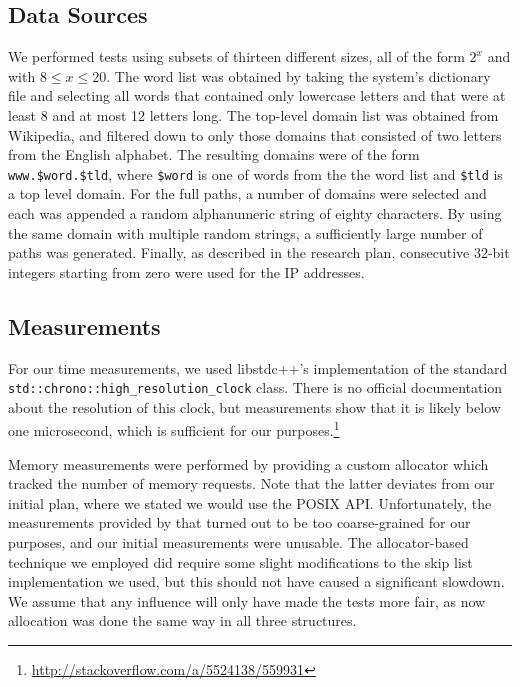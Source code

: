 \documentclass[12pt,a4paper]{article}
\begin{document}
    \subsection{Data Sources}

    We performed tests using subsets of thirteen different sizes, all of the form $2^x$ and with $8
    \le x \le 20$.  The word list was obtained by taking the system's dictionary file and selecting
    all words that contained only lowercase letters and that were at least 8 and at most 12 letters
    long.  The top-level domain list was obtained from Wikipedia, and filtered down to only those
    domains that consisted of two letters from the English alphabet.  The resulting domains were of
    the form \texttt{www.\$word.\$tld}, where \texttt{\$word} is one of words from the the word list
    and \texttt{\$tld} is a top level domain.  For the full paths, a number of domains were selected
    and each was appended a random alphanumeric string of eighty characters.  By using the same
    domain with multiple random strings, a sufficiently large number of paths was generated.
    Finally, as described in the research plan, consecutive 32-bit integers starting from zero were
    used for the IP addresses.

    \subsection{Measurements}
    \label{subsec:measurements}

    For our time measurements, we used libstdc++'s implementation of the standard
    \texttt{std::chrono::high\_resolution\_clock} class.  There is no official documentation about
    the resolution of this clock, but measurements show that it is likely below one microsecond,
    which is sufficient for our purposes.\footnote{\url{http://stackoverflow.com/a/5524138/559931}}

    Memory measurements were performed by providing a custom allocator which tracked the number of
    memory requests.  Note that the latter deviates from our initial plan, where we stated we would
    use the POSIX API.  Unfortunately, the measurements provided by that turned out to be too
    coarse-grained for our purposes, and our initial measurements were unusable.  The
    allocator-based technique we employed did require some slight modifications to the skip list
    implementation we used, but this should not have caused a significant slowdown.  We assume that
    any influence will only have made the tests more fair, as now allocation was done the same way
    in all three structures.
\end{document}
